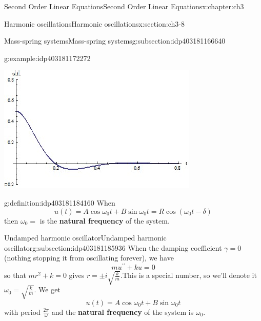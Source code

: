 \documentclass[oneside,10pt,]{book}
\newcommand{\terminology}[1]{\textbf{#1}}
\numberwithin{equation}{section}
\numberwithin{equation}{section}
\begin{document}
\begin{chapterptx}{Second Order Linear Equations}{}{Second Order Linear Equations}{}{}{x:chapter:ch3}
\begin{sectionptx}{Harmonic oscillations}{}{Harmonic oscillations}{}{}{x:section:ch3-8}
\begin{subsectionptx}{Mass-spring systems}{}{Mass-spring systems}{}{}{g:subsection:idp403181166640}
\begin{example}{}{g:example:idp403181172272}
\begin{image}{0}{1}{0}
\includegraphics[width=\linewidth]{images/Spring3.jpg}
\end{image}%
\end{example}
\begin{definition}{}{g:definition:idp403181184160}%
When%
\begin{equation*}
u(t)=A\cos\omega_{0}t+B\sin\omega_{0}t=R\cos\left(\omega_{0}t-\delta\right)
\end{equation*}
then \(\omega_{0}=\) is the \terminology{natural frequency} of the system.%
\end{definition}
\end{subsectionptx}
%
%
\typeout{************************************************}
\typeout{************************************************}
%
\begin{subsectionptx}{Undamped harmonic oscillator}{}{Undamped harmonic oscillator}{}{}{g:subsection:idp403181185936}
When the damping coefficient \(\gamma=0\) (nothing stopping it from oscillating forever), we have%
\begin{equation*}
mu^{\prime\prime}+ku=0
\end{equation*}
so that \(mr^{2}+k=0\) gives \(r=\pm i\sqrt{\frac{k}{m}}.\)This is a special number, so we'll denote it \(\omega_{0}=\sqrt{\frac{k}{m}}.\) We get%
\begin{equation*}
u(t)=A\cos\omega_{0}t+B\sin\omega_{0}t
\end{equation*}
with period \(\frac{2\pi}{\omega}\) and the \terminology{natural frequency} of the system is \(\omega_{0}\).%
\end{subsectionptx}
%
%
\typeout{************************************************}

\end{sectionptx}
\end{chapterptx}
\end{document}
